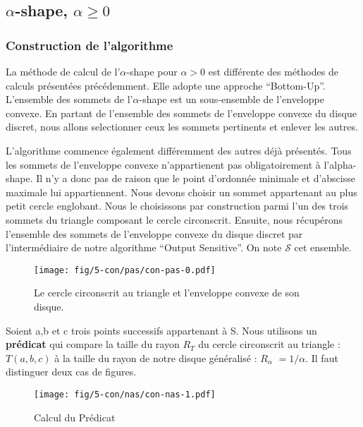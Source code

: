 \subsection{$\alpha$-shape, $\alpha \geq 0$}


\subsubsection{Construction de l'algorithme}

La méthode de calcul de l'$\alpha$-shape pour $\alpha > 0$ est différente des méthodes de calculs présentées précédemment. Elle adopte une approche ``Bottom-Up''. L'ensemble des sommets de l'$\alpha$-shape est un sous-ensemble de l'enveloppe convexe. En partant de l'ensemble des sommets de l'enveloppe convexe du disque discret, nous allons selectionner ceux les sommets pertinents et enlever les autres.

L'algorithme commence également différemment des autres déjà présentés. Tous les sommets de l'enveloppe convexe n'appartienent pas obligatoirement à l'alpha-shape. Il n'y a donc pas de raison que le point d'ordonnée minimale et d'abscisse maximale lui appartiennent. Nous devons choisir un sommet appartenant au plus petit cercle englobant. Nous le choisissons par construction parmi l'un des trois sommets du triangle composant le cercle circonscrit. Ensuite, nous récupérons l'ensemble des sommets de l'enveloppe convexe du disque discret par l'intermédiaire de notre algorithme ``Output Sensitive''. On note $\mathcal{S}$ cet ensemble.

\begin{figure}[H]
  \centering
  \texttt{[image: fig/5-con/pas/con-pas-0.pdf]}
  \caption{Le cercle circonscrit au triangle et l'enveloppe convexe de son disque.}
\end{figure}

Soient a,b et c trois points successifs appartenant à S. Nous utilisons un \textbf{prédicat} qui compare la taille du rayon \textbf{$R_T$} du cercle circonscrit au triangle : $T(a, b, c)$ à la taille du rayon de notre disque généralisé : \textbf{$R_{\alpha}$} $= 1/\alpha$. Il faut distinguer deux cas de figures.\\

\begin{figure}[H]
  \centering
  \texttt{[image: fig/5-con/nas/con-nas-1.pdf]}
  \caption{Calcul du Prédicat}
\end{figure}

